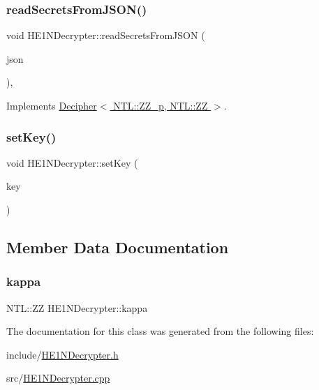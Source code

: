 \subsubsection{\texorpdfstring{read\+Secrets\+From\+J\+S\+O\+N()}{readSecretsFromJSON()}}
{\footnotesize\ttfamily void H\+E1\+N\+Decrypter\+::read\+Secrets\+From\+J\+S\+ON (\begin{DoxyParamCaption}\item[{std\+::string \&}]{json }\end{DoxyParamCaption})\hspace{0.3cm}{\ttfamily [override]}, {\ttfamily [virtual]}}



Implements \hyperlink{classDecipher_a39aea002012130201e12a8fa7d84dda5}{Decipher$<$ N\+T\+L\+::\+Z\+Z\+\_\+p, N\+T\+L\+::\+Z\+Z $>$}.

\mbox{\label{classHE1NDecrypter_a35a7d0c2ce869f417d6dc90792e61e11}} 
\subsubsection{\texorpdfstring{set\+Key()}{setKey()}}
{\footnotesize\ttfamily void H\+E1\+N\+Decrypter\+::set\+Key (\begin{DoxyParamCaption}\item[{N\+T\+L\+::vec\+\_\+\+ZZ \&}]{key }\end{DoxyParamCaption})}



\subsection{Member Data Documentation}
\mbox{\label{classHE1NDecrypter_a409fafa4eaf8d73998d6fee08ce4a8e2}} 
\subsubsection{\texorpdfstring{kappa}{kappa}}
{\footnotesize\ttfamily N\+T\+L\+::\+ZZ H\+E1\+N\+Decrypter\+::kappa\hspace{0.3cm}{\ttfamily [private]}}



The documentation for this class was generated from the following files\+:\begin{DoxyCompactItemize}
\item 
include/\hyperlink{HE1NDecrypter_8h}{H\+E1\+N\+Decrypter.\+h}\item 
src/\hyperlink{HE1NDecrypter_8cpp}{H\+E1\+N\+Decrypter.\+cpp}\end{DoxyCompactItemize}
